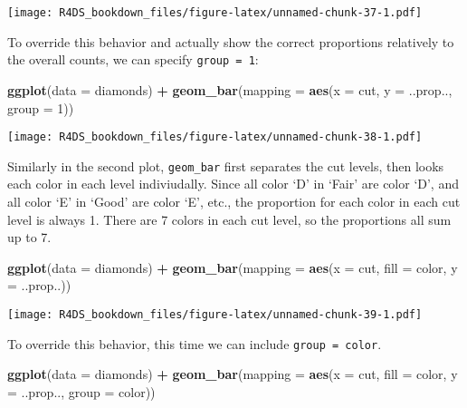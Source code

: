 \documentclass[]{article}
\newenvironment{Shaded}{\begin{snugshade}}{\end{snugshade}}
\newcommand{\KeywordTok}[1]{\textcolor[rgb]{0.13,0.29,0.53}{\textbf{#1}}}
\newcommand{\DataTypeTok}[1]{\textcolor[rgb]{0.13,0.29,0.53}{#1}}
\newcommand{\DecValTok}[1]{\textcolor[rgb]{0.00,0.00,0.81}{#1}}
\newcommand{\StringTok}[1]{\textcolor[rgb]{0.31,0.60,0.02}{#1}}
\newcommand{\OperatorTok}[1]{\textcolor[rgb]{0.81,0.36,0.00}{\textbf{#1}}}
\newcommand{\NormalTok}[1]{#1}
\theoremstyle{definition}
\theoremstyle{definition}
\theoremstyle{definition}
\theoremstyle{remark}
\begin{document}
\texttt{[image: R4DS\_bookdown\_files/figure-latex/unnamed-chunk-37-1.pdf]}

To override this behavior and actually show the correct proportions
relatively to the overall counts, we can specify \texttt{group\ =\ 1}:

\begin{Shaded}
\begin{Highlighting}[]
\KeywordTok{ggplot}\NormalTok{(}\DataTypeTok{data =}\NormalTok{ diamonds) }\OperatorTok{+}\StringTok{ }
\StringTok{  }\KeywordTok{geom_bar}\NormalTok{(}\DataTypeTok{mapping =} \KeywordTok{aes}\NormalTok{(}\DataTypeTok{x =}\NormalTok{ cut, }\DataTypeTok{y =}\NormalTok{ ..prop.., }\DataTypeTok{group =} \DecValTok{1}\NormalTok{))}
\end{Highlighting}
\end{Shaded}

\texttt{[image: R4DS\_bookdown\_files/figure-latex/unnamed-chunk-38-1.pdf]}

Similarly in the second plot, \texttt{geom\_bar} first separates the cut
levels, then looks each color in each level indiviudally. Since all
color `D' in `Fair' are color `D', and all color `E' in `Good' are color
`E', etc., the proportion for each color in each cut level is always 1.
There are 7 colors in each cut level, so the proportions all sum up to
7.

\begin{Shaded}
\begin{Highlighting}[]
\KeywordTok{ggplot}\NormalTok{(}\DataTypeTok{data =}\NormalTok{ diamonds) }\OperatorTok{+}\StringTok{ }
\StringTok{  }\KeywordTok{geom_bar}\NormalTok{(}\DataTypeTok{mapping =} \KeywordTok{aes}\NormalTok{(}\DataTypeTok{x =}\NormalTok{ cut, }\DataTypeTok{fill =}\NormalTok{ color, }\DataTypeTok{y =}\NormalTok{ ..prop..))}
\end{Highlighting}
\end{Shaded}

\texttt{[image: R4DS\_bookdown\_files/figure-latex/unnamed-chunk-39-1.pdf]}

To override this behavior, this time we can include
\texttt{group\ =\ color}.

\begin{Shaded}
\begin{Highlighting}[]
\KeywordTok{ggplot}\NormalTok{(}\DataTypeTok{data =}\NormalTok{ diamonds) }\OperatorTok{+}\StringTok{ }
\StringTok{  }\KeywordTok{geom_bar}\NormalTok{(}\DataTypeTok{mapping =} \KeywordTok{aes}\NormalTok{(}\DataTypeTok{x =}\NormalTok{ cut, }\DataTypeTok{fill =}\NormalTok{ color, }\DataTypeTok{y =}\NormalTok{ ..prop.., }\DataTypeTok{group =}\NormalTok{ color))}
\end{Highlighting}
\end{Shaded}
\end{document}
